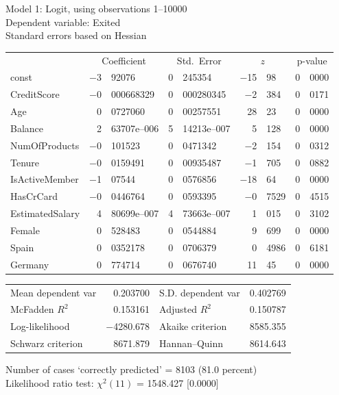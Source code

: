 \documentclass[11pt]{article}
\begin{document}
\thispagestyle{empty}

\begin{center}

Model 1: Logit, using observations 1--10000\\
Dependent variable: Exited\\
Standard errors based on Hessian

\vspace{1em}

\begin{tabular}{lr@{.}lr@{.}lr@{.}lr@{.}l}
  &
 \multicolumn{2}{c}{Coefficient} &
  \multicolumn{2}{c}{Std.\ Error} &
   \multicolumn{2}{c}{$z$} &
    \multicolumn{2}{c}{p-value} \\[1ex]
const &
  $-$3&92076 &
    0&245354 &
      $-$15&98 &
        0&0000 \\
CreditScore &
  $-$0&000668329 &
    0&000280345 &
      $-$2&384 &
        0&0171 \\
Age &
  0&0727060 &
    0&00257551 &
      28&23 &
        0&0000 \\
Balance &
  2&63707\textrm{e--006} &
    5&14213\textrm{e--007} &
      5&128 &
        0&0000 \\
NumOfProducts &
  $-$0&101523 &
    0&0471342 &
      $-$2&154 &
        0&0312 \\
Tenure &
  $-$0&0159491 &
    0&00935487 &
      $-$1&705 &
        0&0882 \\
IsActiveMember &
  $-$1&07544 &
    0&0576856 &
      $-$18&64 &
        0&0000 \\
HasCrCard &
  $-$0&0446764 &
    0&0593395 &
      $-$0&7529 &
        0&4515 \\
EstimatedSalary &
  4&80699\textrm{e--007} &
    4&73663\textrm{e--007} &
      1&015 &
        0&3102 \\
Female &
  0&528483 &
    0&0544884 &
      9&699 &
        0&0000 \\
Spain &
  0&0352178 &
    0&0706379 &
      0&4986 &
        0&6181 \\
Germany &
  0&774714 &
    0&0676740 &
      11&45 &
        0&0000 \\
\end{tabular}

\vspace{1ex}
\begin{tabular}{lrlr}
Mean dependent var &  0.203700 & S.D. dependent var &  0.402769 \\
McFadden $R^2$ &  0.153161 & Adjusted $R^2$ &  0.150787 \\
Log-likelihood & $-$4280.678 & Akaike criterion &  8585.355 \\
Schwarz criterion &  8671.879 & Hannan--Quinn &  8614.643 \\
\end{tabular}


\vspace{1ex}
\vspace{1em}
\begin{raggedright}
Number of cases `correctly predicted' = 8103 (81.0 percent)\\
Likelihood ratio test: $\chi^2(11)$ = 1548.427 [0.0000]\\
\end{raggedright}

\end{center}
\end{document}
